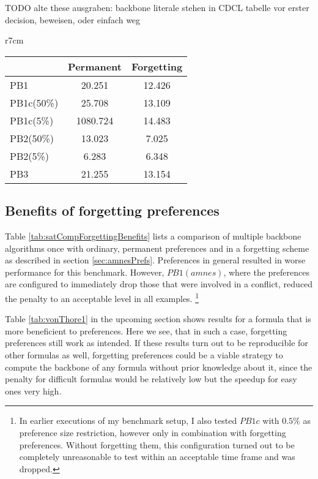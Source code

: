 TODO alte these ausgraben: backbone literale stehen in CDCL tabelle vor erster decision, beweisen, oder einfach weg


\begin{wraptable}[14]{r}{7cm} %
\begin{tabular}{l| c c }
 & Permanent & Forgetting  \\
\hline
PB1 &	20.251 & 12.426 \\
PB1c(50\%) & 25.708 & 13.109 \\
PB1c(5\%) & 1080.724 & 14.483 \\
PB2(50\%) & 13.023 & 7.025 \\
PB2(5\%) & 6.283 & 6.348 \\
PB3 & 21.255 & 13.154 \\
\end{tabular}
\caption{Average of the complete backbone computation for variants of $PrefBones$ with and without forgetting preferences.}
\label{tab:satCompForgettingBenefits}
\end{wraptable}


\subsection{Benefits of forgetting preferences}
Table \ref{tab:satCompForgettingBenefits}
lists a comparison of multiple backbone algorithms once with ordinary, permanent preferences and in a forgetting scheme as described in section \ref{sec:amnesPrefs}. Preferences in general resulted in worse performance for this benchmark. However, $PB1(amnes)$, where the preferences are configured to immediately drop those that were involved in a conflict, reduced the penalty to an acceptable level in all examples. \footnote{
In earlier executions of my benchmark setup, I also tested $PB1c$ with $0.5\%$ as preference size restriction, however only in combination with forgetting preferences. Without forgetting them, this configuration turned out to be completely unreasonable to test within an acceptable time frame and was dropped.}


Table \ref{tab:vonThore1} in the upcoming section shows results for a formula that is more beneficient to preferences. Here we see, that in such a case, forgetting preferences still work as intended. If these results turn out to be reproducible for other formulas as well, forgetting preferences could be a viable strategy to compute the backbone of any formula without prior knowledge about it, since the penalty for difficult formulas would be relatively low but the speedup for easy ones very high.


